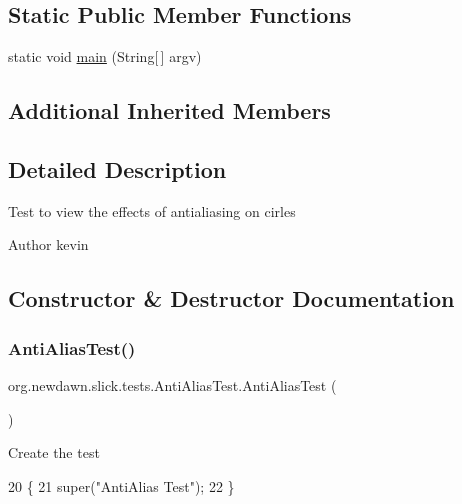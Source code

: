 \subsection*{Static Public Member Functions}
\begin{DoxyCompactItemize}
\item 
static void \mbox{\hyperlink{classorg_1_1newdawn_1_1slick_1_1tests_1_1_anti_alias_test_aa753fc217014868f18f77f9a4d3b1098}{main}} (String\mbox{[}$\,$\mbox{]} argv)
\end{DoxyCompactItemize}
\subsection*{Additional Inherited Members}


\subsection{Detailed Description}
Test to view the effects of antialiasing on cirles

\begin{DoxyAuthor}{Author}
kevin 
\end{DoxyAuthor}


\subsection{Constructor \& Destructor Documentation}
\mbox{\label{classorg_1_1newdawn_1_1slick_1_1tests_1_1_anti_alias_test_a78c785d212d06cdc009b83a401545534}} 
\subsubsection{\texorpdfstring{Anti\+Alias\+Test()}{AntiAliasTest()}}
{\footnotesize\ttfamily org.\+newdawn.\+slick.\+tests.\+Anti\+Alias\+Test.\+Anti\+Alias\+Test (\begin{DoxyParamCaption}{ }\end{DoxyParamCaption})\hspace{0.3cm}{\ttfamily [inline]}}

Create the test 
\begin{DoxyCode}
20                            \{
21         super(\textcolor{stringliteral}{"AntiAlias Test"});
22     \}
\end{DoxyCode}


